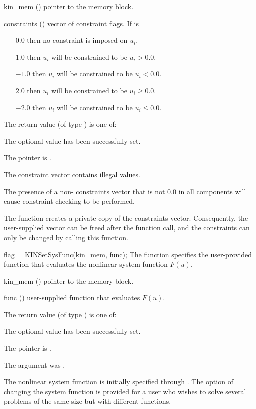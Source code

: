 {
  \begin{args}[constraints]
  \item[kin\_mem] ()
    pointer to the {\kinsol} memory block.
  \item[constraints] ()
    vector of constraint flags. If  is
    \begin{itemize}    
    \item[$0.0$] then no constraint is imposed on $u_i$. 
    \item[$1.0$] then $u_i$ will be constrained to be $u_i > 0.0$.
    \item[$-1.0$] then $u_i$ will be constrained to be $u_i < 0.0$.
    \item[$2.0$] then $u_i$ will be constrained to be $u_i \ge 0.0$.
    \item[$-2.0$] then $u_i$ will be constrained to be $u_i \le 0.0$.
    \end{itemize}
  \end{args}
}
{
  The return value  (of type ) is one of:
  \begin{args}
  \item[\Id{KIN\_SUCCESS}] 
    The optional value has been successfully set.
  \item[\Id{KIN\_MEM\_NULL}]
    The  pointer is .
  \item[\Id{KIN\_ILL\_INPUT}]
    The constraint vector contains illegal values.
  \end{args}
}
{
  The presence of a non- constraints vector that is not $0.0$ in
  all components will cause constraint checking to be performed.

  The function creates a private copy of the constraints vector. Consequently,
  the user-supplied vector can be freed after the function call, and
  the constraints can only be changed by calling this function.
}
{
flag = KINSetSysFunc(kin\_mem, func);
}
{
  The function  specifies the user-provided function
  that evaluates the nonlinear system function $F(u)$.
}
{
  \begin{args}
  \item[kin\_mem] ()
    pointer to the {\kinsol} memory block.
  \item[func] ()
    user-supplied function that evaluates $F(u)$.
  \end{args}
}
{
  The return value  (of type ) is one of:
  \begin{args}
  \item[\Id{KIN\_SUCCESS}] 
    The optional value has been successfully set.
  \item[\Id{KIN\_MEM\_NULL}]
    The  pointer is .
  \item[\Id{KIN\_ILL\_INPUT}]
    The argument  was .
  \end{args}
}
{
  The nonlinear system function is initially specified through .
  The option of changing the system function is provided for a user who wishes 
  to solve several problems of the same size but with different functions.
}

